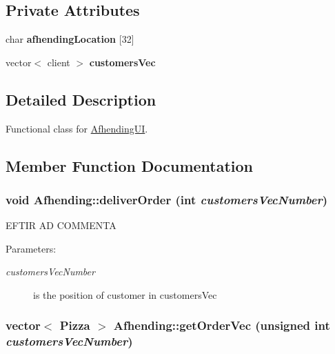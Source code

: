 \subsection*{Private Attributes}
\begin{CompactItemize}
\item 
\hypertarget{class_afhending_85acd631eb078696afb9935bedeeb107}{
char {\bf afhending\-Location} \mbox{[}32\mbox{]}}
\label{class_afhending_85acd631eb078696afb9935bedeeb107}

\item 
\hypertarget{class_afhending_52cc86469dd41b9be5b7186d6bd00589}{
vector$<$ client $>$ {\bf customers\-Vec}}
\label{class_afhending_52cc86469dd41b9be5b7186d6bd00589}

\end{CompactItemize}


\subsection{Detailed Description}
Functional class for \hyperlink{class_afhending_u_i}{Afhending\-UI}. 



\subsection{Member Function Documentation}
\hypertarget{class_afhending_b3cb078e2502d2eb7e6e67623cbe30b9}{
\subsubsection[deliverOrder]{\setlength{\rightskip}{0pt plus 5cm}void Afhending::deliver\-Order (int {\em customers\-Vec\-Number})}}
\label{class_afhending_b3cb078e2502d2eb7e6e67623cbe30b9}


EFTIR AD  COMMENTA

\begin{Desc}
\item[Parameters:]
\begin{description}
\item[{\em customers\-Vec\-Number}]is the position of customer in customers\-Vec \end{description}
\end{Desc}
\hypertarget{class_afhending_ad0cbeddec394b25c5eade57247f4110}{
\subsubsection[getOrderVec]{\setlength{\rightskip}{0pt plus 5cm}vector$<$ Pizza $>$ Afhending::get\-Order\-Vec (unsigned int {\em customers\-Vec\-Number})}}
\label{class_afhending_ad0cbeddec394b25c5eade57247f4110}



